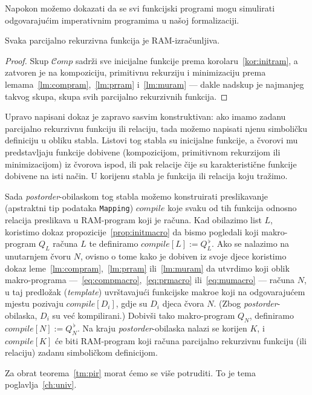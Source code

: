Napokon možemo dokazati da se svi funkcijski programi mogu simulirati odgovarajućim imperativnim programima u našoj formalizaciji.

\begin{teorem}[{name=[RAM-izračunljivost parcijalno rekurzivnih funkcija]}]\label{tm:pir}
Svaka parcijalno rekurzivna funkcija je RAM-izračunljiva.
\end{teorem}
\begin{proof}
Skup $\mathscr Comp$ sadrži sve inicijalne funkcije prema korolaru~\ref{kor:initram}, a zatvoren je na kompoziciju, primitivnu rekurziju i minimizaciju prema lemama~\ref{lm:compram},~\ref{lm:prram} i~\ref{lm:muram} --- dakle nadskup je najmanjeg takvog skupa, skupa svih parcijalno rekurzivnih funkcija.
\end{proof}

Upravo napisani dokaz je zapravo sasvim konstruktivan: ako imamo zadanu parcijalno rekurzivnu funkciju ili relaciju, tada možemo napisati njenu simboličku definiciju u obliku stabla. Listovi tog stabla su inicijalne funkcije, a čvorovi mu predstavljaju funkcije dobivene (kompozicijom, primitivnom rekurzijom ili minimizacijom) iz čvorova ispod, ili pak relacije čije su karakteristične funkcije dobivene na isti način. U korijenu stabla je funkcija ili relacija koju tražimo.

Sada \emph{postorder}-obilaskom tog stabla možemo konstruirati preslikavanje (apstraktni tip podataka \texttt{Mapping}) $compile$ koje svaku od tih funkcija odnosno relacija preslikava u RAM-program koji je računa. Kad obilazimo list $L$, koristimo dokaz propozicije~\ref{prop:initmacro} da bismo pogledali koji makro-program $Q_L$ računa $L$ te definiramo $compile[L]:=Q_L^{\,\flat}$. Ako se nalazimo na unutarnjem čvoru $N$, ovisno o tome kako je dobiven iz svoje djece koristimo dokaz leme~\ref{lm:compram},~\ref{lm:prram} ili~\ref{lm:muram} da utvrdimo koji oblik makro-programa ---~\eqref{eq:compmacro},~\eqref{eq:prmacro} ili~\eqref{eq:mumacro} --- računa $N$, u taj predložak (\emph{template}) uvrštavajući funkcijske makroe koji na odgovarajućem mjestu pozivaju $compile[D_i]$, gdje su $D_i$ djeca čvora $N$. (Zbog \emph{postorder}-obilaska, $D_i$ su već kompilirani.) Dobivši tako makro-program $Q_N$, definiramo $compile[N]:=Q_N^{\,\flat}$. Na kraju \emph{postorder}-obilaska nalazi se korijen $K$, i $compile[K]$ će biti RAM-program koji računa parcijalno rekurzivnu funkciju (ili relaciju) zadanu simboličkom definicijom.

Za obrat teorema~\ref{tm:pir} morat ćemo se više potruditi. To je tema poglavlja~\ref{ch:univ}.


